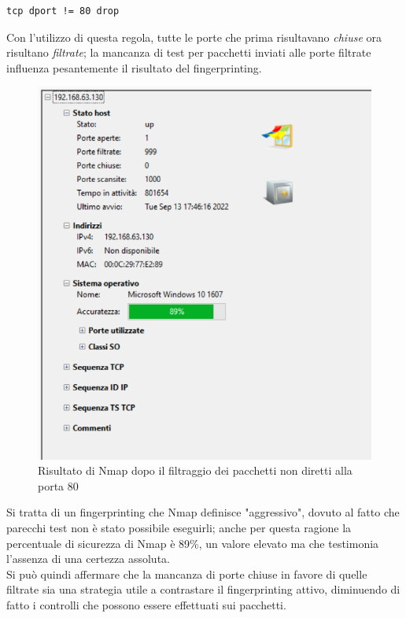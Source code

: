\begin{lstlisting}[caption={Regola per il blocco di tutti i pacchetti ricevuti non diretti alla porta 80}]
	tcp dport != 80 drop
\end{lstlisting}

Con l'utilizzo di questa regola, tutte le porte che prima risultavano \textit{chiuse} ora risultano \textit{filtrate}; la mancanza di test per pacchetti inviati alle porte filtrate influenza pesantemente il risultato del fingerprinting.

\begin{figure}[H]
	\centering
	\includegraphics[scale=0.85]{figures/windows_nmap.png}
	\caption{Risultato di Nmap dopo il filtraggio dei pacchetti non diretti alla porta 80}
	\label{windows_nmap}
\end{figure}

Si tratta di un fingerprinting che Nmap definisce "aggressivo", dovuto al fatto che parecchi test non è stato possibile eseguirli; anche per questa ragione la percentuale di sicurezza di Nmap è 89\%, un valore elevato ma che testimonia l'assenza di una certezza assoluta.\\
Si può quindi affermare che la mancanza di porte chiuse in favore di quelle filtrate sia una strategia utile a contrastare il fingerprinting attivo, diminuendo di fatto i controlli che possono essere effettuati sui pacchetti.

